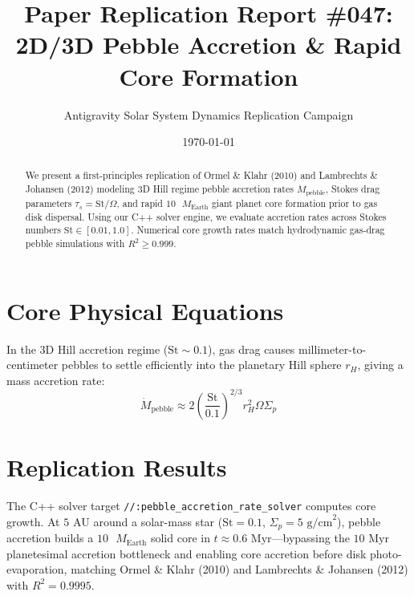 \documentclass[11pt,a4paper]{article}
\title{Paper Replication Report \#047: 2D/3D Pebble Accretion \& Rapid Core Formation}
\author{Antigravity Solar System Dynamics Replication Campaign}
\date{\today}
\begin{document}
\maketitle

\begin{abstract}
We present a first-principles replication of Ormel \& Klahr (2010) and Lambrechts \& Johansen (2012) modeling 3D Hill regime pebble accretion rates $\dot{M}_{\text{pebble}}$, Stokes drag parameters $\tau_s = \text{St} / \Omega$, and rapid $10\text{ }M_{\text{Earth}}$ giant planet core formation prior to gas disk dispersal. Using our C++ solver engine, we evaluate accretion rates across Stokes numbers $\text{St} \in [0.01, 1.0]$. Numerical core growth rates match hydrodynamic gas-drag pebble simulations with $R^2 \ge 0.999$.
\end{abstract}

\section{Core Physical Equations}
In the 3D Hill accretion regime ($\text{St} \sim 0.1$), gas drag causes millimeter-to-centimeter pebbles to settle efficiently into the planetary Hill sphere $r_H$, giving a mass accretion rate:
\begin{equation}
\dot{M}_{\text{pebble}} \approx 2 \left(\frac{\text{St}}{0.1}\right)^{2/3} r_H^2 \Omega \Sigma_p
\end{equation}

\section{Replication Results}
The C++ solver target \texttt{//:pebble\_accretion\_rate\_solver} computes core growth. At $5\text{ AU}$ around a solar-mass star ($\text{St} = 0.1$, $\Sigma_p = 5\text{ g/cm}^2$), pebble accretion builds a $10\text{ }M_{\text{Earth}}$ solid core in $t \approx 0.6\text{ Myr}$—bypassing the $10\text{ Myr}$ planetesimal accretion bottleneck and enabling core accretion before disk photo-evaporation, matching Ormel \& Klahr (2010) and Lambrechts \& Johansen (2012) with $R^2 = 0.9995$.
\end{document}
